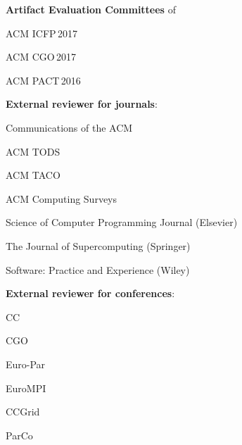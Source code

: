 \documentclass[11pt,a4paper]{moderncv}
\newcommand{\strong}[1]{\textcolor{color1}{\textbf{#1}}}
\newcommand{\highlight}[1]{\textcolor{color1}{#1}}
\begin{document}
\begin{cvitemize}
  \item \strong{Artifact Evaluation Committees} of
    \begin{inlineItemize}
      \item \highlight{ACM ICFP\,2017}
      \item \highlight{ACM CGO\,2017}
      \item \highlight{ACM PACT\,2016}
    \end{inlineItemize}
\end{cvitemize}
\begin{cvitemize}
  \item \strong{External reviewer for journals}:
    \begin{inlineItemize}
      \item \highlight{Communications of the ACM}
      \item \highlight{ACM TODS}
      \item \highlight{ACM TACO}
      \item \highlight{ACM Computing Surveys}
      \item \highlight{Science of Computer Programming Journal (Elsevier)}
      \item \highlight{The Journal of Supercomputing (Springer)}
      \item \highlight{Software: Practice and Experience (Wiley)}
    \end{inlineItemize}
\end{cvitemize}
\begin{cvitemize}
  \item \strong{External reviewer for conferences}:
    \begin{inlineItemize}
      \item \highlight{CC}
      \item \highlight{CGO}
      \item \highlight{Euro-Par}
      \item \highlight{EuroMPI}
      \item \highlight{CCGrid}
      \item \highlight{ParCo}
    \end{inlineItemize}
\end{cvitemize}
\end{document}
